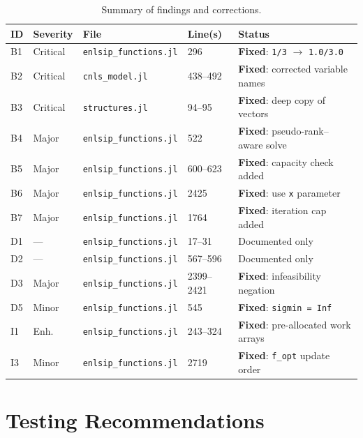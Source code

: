 \documentclass[11pt, a4paper]{article}
\begin{document}
\begin{table}[ht]
\centering
\caption{Summary of findings and corrections.}
\label{tab:summary}
\small
\begin{tabular}{@{}llllp{5.2cm}@{}}
\toprule
\textbf{ID} & \textbf{Severity} & \textbf{File} & \textbf{Line(s)} & \textbf{Status} \\
\midrule
B1 & Critical & \texttt{enlsip\_functions.jl} & 296     & \textbf{Fixed}: \texttt{1/3} $\to$ \texttt{1.0/3.0} \\
B2 & Critical & \texttt{cnls\_model.jl}       & 438--492 & \textbf{Fixed}: corrected variable names \\
B3 & Critical & \texttt{structures.jl}        & 94--95   & \textbf{Fixed}: deep copy of vectors \\
B4 & Major    & \texttt{enlsip\_functions.jl} & 522     & \textbf{Fixed}: pseudo-rank--aware solve \\
B5 & Major    & \texttt{enlsip\_functions.jl} & 600--623 & \textbf{Fixed}: capacity check added \\
B6 & Major    & \texttt{enlsip\_functions.jl} & 2425    & \textbf{Fixed}: use \texttt{x} parameter \\
B7 & Major    & \texttt{enlsip\_functions.jl} & 1764    & \textbf{Fixed}: iteration cap added \\
\midrule
D1 & ---      & \texttt{enlsip\_functions.jl} & 17--31  & Documented only \\
D2 & ---      & \texttt{enlsip\_functions.jl} & 567--596 & Documented only \\
D3 & Major    & \texttt{enlsip\_functions.jl} & 2399--2421 & \textbf{Fixed}: infeasibility negation \\
D5 & Minor    & \texttt{enlsip\_functions.jl} & 545     & \textbf{Fixed}: \texttt{sigmin = Inf} \\
\midrule
I1 & Enh.     & \texttt{enlsip\_functions.jl} & 243--324 & \textbf{Fixed}: pre-allocated work arrays \\
I3 & Minor    & \texttt{enlsip\_functions.jl} & 2719    & \textbf{Fixed}: \texttt{f\_opt} update order \\
\bottomrule
\end{tabular}
\end{table}

\section{Testing Recommendations}
\end{document}
